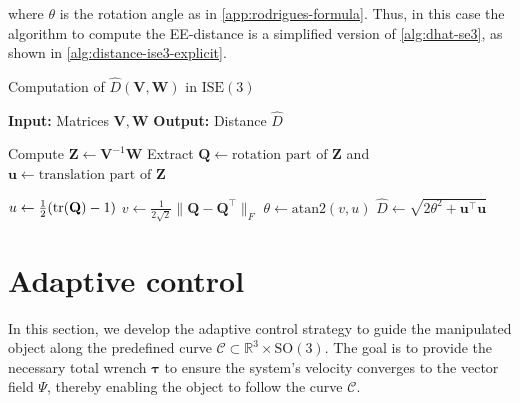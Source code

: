 where $\theta$ is the rotation angle as in \cref{app:rodrigues-formula}. Thus, in this case the algorithm to compute the EE-distance is a simplified version of \cref{alg:dhat-se3}, as shown in \cref{alg:distance-ise3-explicit}.
\begin{algorithm}
    \caption{Computation of $\widehat{D}(\mathbf{V}, \mathbf{W})$ in $\text{ISE}(3)$}
    \label{alg:distance-ise3-explicit}
    \begin{algorithmic}[1]\label{alg:dhat-ise3}
        \Statex \textbf{Input:} Matrices $\mathbf{V}, \mathbf{W}$
        \Statex \textbf{Output:} Distance $\widehat{D}$
        
        \State Compute $\mathbf{Z} \gets \mathbf{V}^{-1}\mathbf{W}$
        \State Extract $\mathbf{Q} \gets \text{rotation part of } \mathbf{Z}$ and $\mathbf{u} \gets \text{translation part of } \mathbf{Z}$

        \State $u \gets \frac{1}{2} (\operatorname{tr}(\mathbf{Q}) - 1)$
        \State $v \gets \frac{1}{2\sqrt{2}} \|\mathbf{Q} - \mathbf{Q}^\top\|_F$
        \State $\theta \gets \text{atan2}(v, u)$
        \State $\widehat{D} \gets \sqrt{2\theta^2 + \mathbf{u}^\top\mathbf{u}}$
    \end{algorithmic}
\end{algorithm}


\section{Adaptive control}
In this section, we develop the adaptive control strategy to guide the manipulated object along the predefined curve $\mathcal{C}\subset \mathbb{R}^3\times \text{SO}(3)$. The goal is to provide the necessary total wrench $\boldsymbol{\tau}$ to ensure the system's velocity converges to the vector field $\Psi$, thereby enabling the object to follow the curve $\mathcal{C}$.

